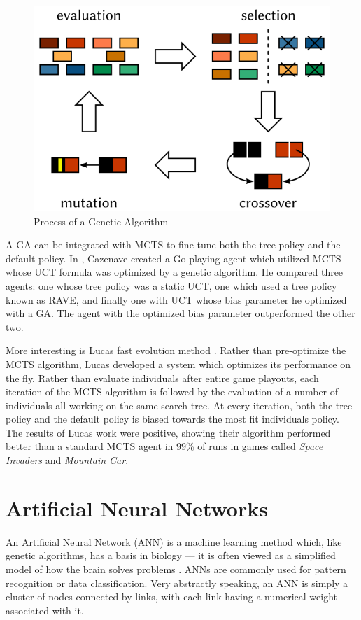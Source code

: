 \begin{figure}[h]
    \centering
    \includegraphics[clip, scale=.3]{images/GA1.png}
    \caption{Process of a Genetic Algorithm}
    \label{fig:GA}
\end{figure}

A GA can be integrated with MCTS to fine-tune both the tree policy and the default policy.  In \cite{Cazenave2007}, Cazenave created a Go-playing agent which utilized MCTS whose UCT formula was optimized by a genetic algorithm.  He compared three agents: one whose tree policy was a static UCT, one which used a tree policy known as RAVE, and finally one with UCT whose bias parameter he optimized with a GA.  The agent with the optimized bias parameter outperformed the other two.

More interesting is Lucas \etals fast evolution method \cite{lucas2014fast}.  Rather than pre-optimize the MCTS algorithm, Lucas \etal developed a system which optimizes its performance on the fly.  Rather than evaluate individuals after entire game playouts, each iteration of the MCTS algorithm is followed by the evaluation of a number of individuals all working on the same search tree.  At every iteration, both the tree policy and the default policy is biased towards the most fit individuals policy.  The results of Lucas \etals work were positive, showing their algorithm performed better than a standard MCTS agent in 99\% of runs in games called \textit{Space Invaders} and \textit{Mountain Car}.

\section{Artificial Neural Networks}
An Artificial Neural Network (ANN) is a machine learning method which, like genetic algorithms, has a basis in biology --- it is often viewed as a simplified model of how the brain solves problems \cite{aimodern}.  ANNs  are commonly used for pattern recognition or data classification.  Very abstractly speaking, an ANN is simply a cluster of nodes connected by links, with each link having a numerical weight associated with it.


